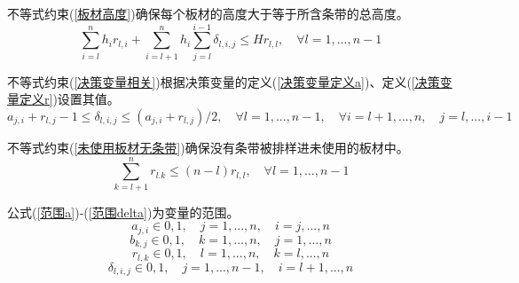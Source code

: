 \documentclass[bwprint]{gmcmthesis}
\begin{document}
不等式约束(\ref{板材高度})确保每个板材的高度大于等于所含条带的总高度。
\begin{equation}
    \sum_{i=l}^{n} h_i r_{l,i} +\sum_{i=l+1}^{n} h_i \sum_{j=l}^{i-1} \delta_{l,i,j} \le H r_{l,l}, \quad \forall l=1,...,n-1 \label{板材高度}
\end{equation}

不等式约束(\ref{决策变量相关})根据决策变量的定义(\ref{决策变量定义a})、定义(\ref{决策变量定义r})设置其值。
\begin{equation}
    a_{j,i}+r_{l,j}-1 \le \delta_{l,i,j} \le (a_{j,i}+r_{l,j})/2, \quad \forall l=1,...,n-1,\quad \forall i=l+1,...,n,\quad j=l,...,i-1 \label{决策变量相关}
\end{equation}

不等式约束(\ref{未使用板材无条带})确保没有条带被排样进未使用的板材中。
\begin{equation}
    \sum_{k=l+1}^{n} r_{l.k} \le (n-l)r_{l,l}, \quad \forall l=1,...,n-1 \label{未使用板材无条带}
\end{equation}

公式(\ref{范围a})-(\ref{范围delta})为变量的范围。
\begin{equation}
    a_{j,i} \in {0,1}, \quad j=1,...,n , \quad i=j,...,n \label{范围a}
\end{equation}
\begin{equation}
    b_{k,j} \in {0,1}, \quad k=1,...,n , \quad j=1,...,n \label{范围b}
\end{equation}
\begin{equation}
    r_{l,k} \in {0,1}, \quad l=1,...,n , \quad k=l,...,n \label{范围r}
\end{equation}
\begin{equation}
    \delta_{l,i,j} \in {0,1}, \quad j=1,...,n-1 , \quad i=l+1,...,n \label{范围delta}
\end{equation}
\end{document}
